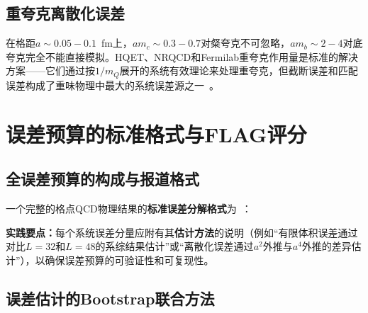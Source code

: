 \documentclass[12pt,a4paper]{ctexart}
\begin{document}
\subsection{重夸克离散化误差}

在格距$a \sim 0.05-0.1$~fm上，$am_c \sim 0.3-0.7$对粲夸克不可忽略，$am_b \sim 2-4$对底夸克完全不能直接模拟。HQET、NRQCD和Fermilab重夸克作用量是标准的解决方案——它们通过按$1/m_Q$展开的系统有效理论来处理重夸克，但截断误差和匹配误差构成了重味物理中最大的系统误差源之一~\cite{GattringerLang2010}。

\section{误差预算的标准格式与FLAG评分}

\subsection{全误差预算的构成与报道格式}

一个完整的格点QCD物理结果的\textbf{标准误差分解格式}为~\cite{Gupta1997intro,GattringerLang2010}：

\begin{center}
\end{center}

\textbf{实践要点：}每个系统误差分量应附有其\textbf{估计方法}的说明（例如``有限体积误差通过对比$L=32$和$L=48$的系综结果估计''或``离散化误差通过$a^2$外推与$a^4$外推的差异估计''），以确保误差预算的可验证性和可复现性。

\subsection{误差估计的Bootstrap联合方法}
\end{document}
